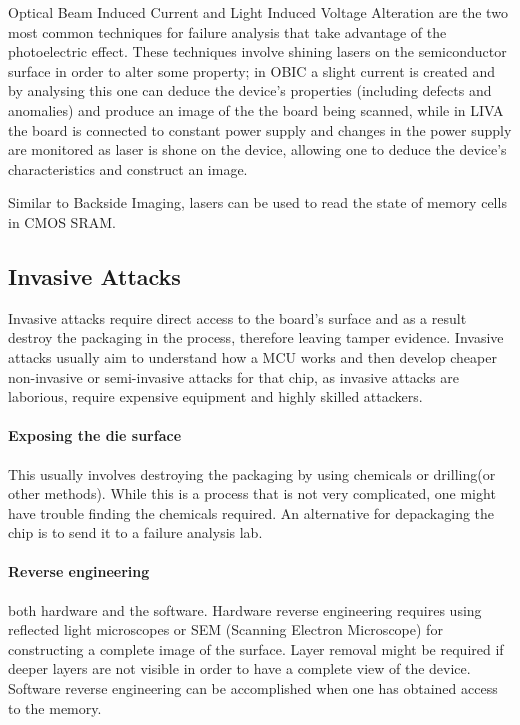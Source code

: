 	Optical Beam Induced Current and Light Induced Voltage Alteration are the two most common techniques for failure analysis that take advantage of the photoelectric effect. These techniques involve shining lasers on the semiconductor surface in order to alter some property; in OBIC a slight current is created and by analysing this one can deduce the device's properties (including defects and anomalies) and produce an image of the the board being scanned, while in LIVA the board is connected to constant power supply and changes in the power supply are monitored as laser is shone on the device, allowing one to deduce the device's characteristics and construct an image\citep{cole:OBIC}.
	
	Similar to Backside Imaging, lasers can be used to read the state of memory cells in CMOS SRAM.
	
	\subsection{Invasive Attacks}
	Invasive attacks require direct access to the board's surface and as a result destroy the packaging in the process, therefore leaving tamper evidence\citep{sergei:thesis}\citep{hwre}. Invasive attacks usually aim to understand how a MCU works and then develop cheaper non-invasive or semi-invasive attacks for that chip, as invasive attacks are laborious, require expensive equipment and highly skilled attackers\citep{sergei:thesis}.
	
	\paragraph{Exposing the die surface} This usually involves destroying the packaging by using chemicals or drilling(or other methods). While this is a process that is not very complicated\citep{sergei:thesis}, one might have trouble finding the chemicals required. An alternative for depackaging the chip is to send it to a failure analysis lab\citep{website:hacking_the_pic}.
	
	\paragraph{Reverse engineering} both hardware and the software. Hardware reverse engineering requires using reflected light microscopes or SEM (Scanning Electron Microscope) for constructing a complete image of the surface. Layer removal might be required if deeper layers are not visible in order to have a complete view of the device. Software reverse engineering can be accomplished when one has obtained access to the memory.
	
